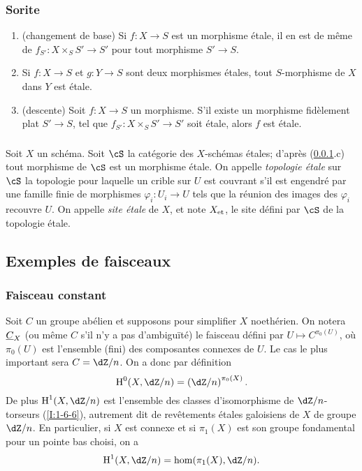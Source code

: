 \subsubsection{Sorite}\label{I:2-1-3}
\begin{enumerate}[\indent a)]
  \item (changement de base) Si $f:X\to S$ est un morphisme étale, il en est 
    de même de $f_{S'}:X\times_S S'\to S'$ pour tout morphisme $S'\to S$. 
  \item Si $f:X\to S$ et $g:Y\to S$ sont deux morphismes étales, tout 
    $S$-morphisme de $X$ dans $Y$ est étale.
  \item (descente) Soit $f:X\to S$ un morphisme. S'il existe un morphisme 
    fidèlement plat $S'\to S$, tel que $f_{S'}:X\times_S S'\to S'$ soit 
    étale, alors $f$ est étale.
\end{enumerate}





\subsubsection{}\label{I:2-1-4}

Soit $X$ un schéma. Soit $\cS$ la catégorie des $X$-schémas étales; 
d'après (\ref{I:2-1-3}.c) tout morphisme de $\cS$ est un morphisme étale. 
On appelle \emph{topologie étale} sur $\cS$ la topologie pour laquelle un 
crible sur $U$ est couvrant s'il est engendré par une famille finie de 
morphismes $\varphi_i:U_i\to U$ tels que la réunion des images des 
$\varphi_i$ recouvre $U$. On appelle \emph{site étale} de $X$, et note 
${X}_{\textnormal{et}}$, le site défini par $\cS$ de la topologie étale. 










\subsection{Exemples de faisceaux}\label{I:2-2}





\subsubsection{Faisceau constant}\label{I:2-2-1}

Soit $C$ un groupe abélien et supposons pour simplifier $X$ noethérien. On 
notera $\underline{C}_X$ (ou même $C$ s'il n'y a pas d'ambiguïté) le faisceau 
défini par $U\mapsto C^{\pi_0(U)}$, où $\pi_0(U)$ est l'ensemble (fini) des 
composantes connexes de $U$. Le cas le plus important sera $C=\dZ/n$. On a donc 
par définition 
\[
  \h^0(X,\dZ/n)=\left(\dZ/n\right)^{\pi_0(X)}\text{.}
\]
De plus $\h^1(X,\dZ/n)$ est l'ensemble des classes d'isomorphisme de 
$\dZ/n$-torseurs (\ref{I:1-6-6}), autrement dit de revêtements étales 
galoisiens de $X$ de groupe $\dZ/n$. En particulier, si $X$ est connexe et si 
$\pi_1(X)$ est son groupe fondamental pour un pointe bas choisi, on a 
\[
  \h^1(X,\dZ/n) = \hom(\pi_1(X),\dZ/n)\text{.}
\]





